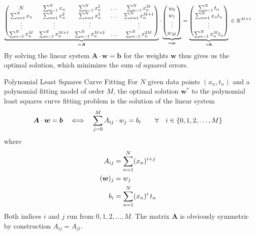 \documentclass[11pt, DINA4, fleqn]{amsart}
\def\vw{\boldsymbol{w}\xspace}
\def\vb{\boldsymbol{b}\xspace}
\def\mA{\boldsymbol{A}\xspace}
\begin{document}
\begin{align}
\underbrace{
\begin{pmatrix}
N & \sum\displaylimits_{n = 1}^{N}x_n & \sum\displaylimits_{n = 1}^{N}x_n^2 & \dots & \sum\displaylimits_{n = 1}^{N}x_n^M \\
\sum\displaylimits_{n = 1}^{N}x_n & \sum\displaylimits_{n = 1}^{N}x_n^2 &
\sum\displaylimits_{n = 1}^{N}x_n^3 & \dots &
\sum\displaylimits_{n = 1}^{N}x_n^{M + 1} \\
\vdots & \vdots & \vdots && \vdots \\ 
\sum\displaylimits_{n = 1}^{N}x_n^M &
\sum\displaylimits_{n = 1}^{N}x_n^{M+1} &
\sum\displaylimits_{n = 1}^{N}x_n^{M+2} &
\dotsc &  \sum\displaylimits_{n = 1}^{N}x_n^{2M}
\end{pmatrix}}_{=\mA} \cdot
\underbrace{\begin{pmatrix}
w_0 \\ w_1 \\ \vdots \\ w_M
\end{pmatrix}}_{=\vw}
=
\underbrace{\begin{pmatrix}
\sum\displaylimits_{n = 1}^{N} t_n \\
\sum\displaylimits_{n = 1}^{N} x_n t_n \\
\vdots \\
\sum\displaylimits_{n = 1}^{N} x_n^M t_n 
\end{pmatrix}}_{=\vb} \, \in \mathbb{R}^{M+1}
\label{eq:explicitMatrixForm1}
\end{align}
By solving the linear system $\mA \cdot \vw = \vb$ for the weights $\vw$ thus gives us the optimal solution, which minimizes the sum of squared errors.

\begin{mybox_tc3}{Polynomial Least Squares Curve Fitting}
	For $N$ given data points $(x_n, t_n)$ and a polynomial fitting model of order $M$,
	the optimal solution $\vw^*$ to the polynomial least squares curve fitting problem is the solution of the linear system
	\begin{align}
	\mA \cdot \vw = \vb \quad \Longleftrightarrow \quad \sum \displaylimits_{j = 0}^{M} A_{ij} \cdot w_j = b_i  \qquad \forall\quad i \in \{0, 1, 2, \dotsc, M\}
	\end{align}
	where
	\begin{align}
	A_{ij} &= \sum \displaylimits_{n = 1}^{N} (x_n)^{i + j} \\
	(\vw)_j &= w_j \\
	b_i &= \sum \displaylimits_{n = 1}^{N} (x_n)^{i} \, t_n
	\end{align}
	Both indices $i$ and $j$ run from $0, 1, 2, \dotsc, M$.
	The matrix $\mA$ is obviously symmetric by construction $A_{ij} = A_{ji}$.
\end{mybox_tc3}
\end{document}
